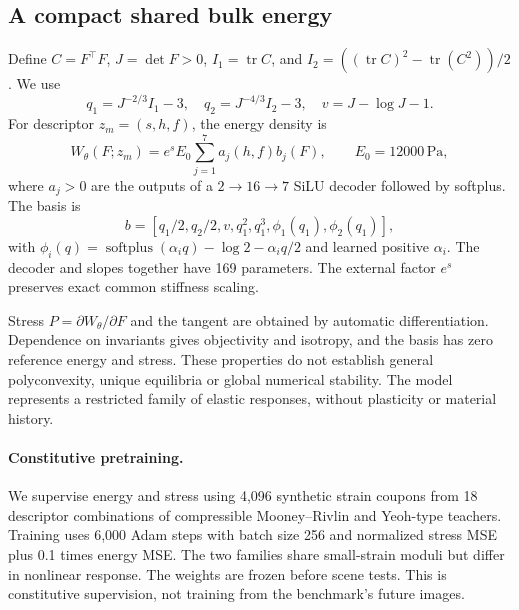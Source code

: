 \documentclass[10pt,twocolumn,letterpaper]{article}
\begin{document}
\subsection{A compact shared bulk energy}
Define $C=F^\top F$, $J=\det F>0$, $I_1=\operatorname{tr}C$, and $I_2=((\operatorname{tr}C)^2-\operatorname{tr}(C^2))/2$. We use
\begin{equation}
 q_1=J^{-2/3}I_1-3,\quad q_2=J^{-4/3}I_2-3,\quad v=J-\log J-1.
\end{equation}
For descriptor $z_m=(s,h,f)$, the energy density is
\begin{equation}\label{eq:bulk}
 W_\theta(F;z_m)=e^s E_0\sum_{j=1}^{7}a_j(h,f)b_j(F),\qquad E_0=12000\,\mathrm{Pa},
\end{equation}
where $a_j>0$ are the outputs of a $2\!\to\!16\!\to\!7$ SiLU decoder followed by softplus. The basis is
\begin{equation}
 b=[q_1/2,q_2/2,v,q_1^2,q_1^3,\phi_1(q_1),\phi_2(q_1)],
\end{equation}
with $\phi_i(q)=\operatorname{softplus}(\alpha_iq)-\log2-\alpha_iq/2$ and learned positive $\alpha_i$. The decoder and slopes together have 169 parameters. The external factor $e^s$ preserves exact common stiffness scaling.

Stress $P=\partial W_\theta/\partial F$ and the tangent are obtained by automatic differentiation. Dependence on invariants gives objectivity and isotropy, and the basis has zero reference energy and stress. These properties do not establish general polyconvexity, unique equilibria or global numerical stability. The model represents a restricted family of elastic responses, without plasticity or material history.



\paragraph{Constitutive pretraining.}
We supervise energy and stress using 4,096 synthetic strain coupons from 18 descriptor combinations of compressible Mooney--Rivlin and Yeoh-type teachers. Training uses 6,000 Adam steps with batch size 256 and normalized stress MSE plus 0.1 times energy MSE. The two families share small-strain moduli but differ in nonlinear response. The weights are frozen before scene tests. This is constitutive supervision, not training from the benchmark's future images.
\end{document}
